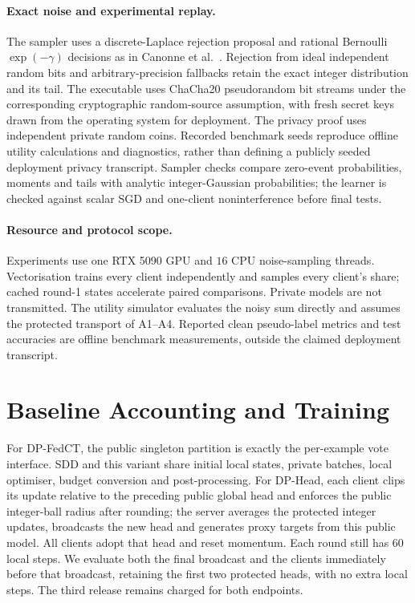 \paragraph{Exact noise and experimental replay.}
The sampler uses a discrete-Laplace rejection proposal and rational
Bernoulli $\exp(-\gamma)$ decisions as in Canonne et al.~\cite{canonne2020discrete}.
Rejection from ideal independent random bits and arbitrary-precision fallbacks
retain the exact integer distribution and its tail. The executable uses
ChaCha20 pseudorandom bit streams under the corresponding cryptographic
random-source assumption, with fresh secret keys drawn from the operating
system for deployment. The privacy proof uses independent private random coins.
Recorded benchmark seeds reproduce offline utility calculations and diagnostics,
rather than defining a publicly seeded deployment privacy transcript.
Sampler checks compare zero-event probabilities, moments and tails with
analytic integer-Gaussian probabilities; the learner is checked against scalar
SGD and one-client noninterference before final tests.

\paragraph{Resource and protocol scope.}
Experiments use one RTX 5090 GPU and $16$ CPU noise-sampling threads.
Vectorisation trains every client independently and samples every client's
share; cached round-1 states accelerate paired comparisons.
Private models are not transmitted. The utility simulator evaluates the noisy
sum directly and assumes the protected transport of A1--A4.
Reported clean pseudo-label metrics and test accuracies are offline benchmark
measurements, outside the claimed deployment transcript.

\section{Baseline Accounting and Training}
\label{app:baselines}

For DP-FedCT, the public singleton partition is exactly the per-example vote
interface. SDD and this variant share initial local states, private batches,
local optimiser, budget conversion and post-processing.
For DP-Head, each client clips its update relative to the preceding public
global head and enforces the public integer-ball radius after rounding; the server averages the protected integer updates, broadcasts
the new head and generates proxy targets from this public model.
All clients adopt that head and reset momentum. Each round still has $60$
local steps. We evaluate both the final broadcast and the clients immediately before that
broadcast, retaining the first two protected heads, with no extra local steps.
The third release remains charged for both endpoints.

